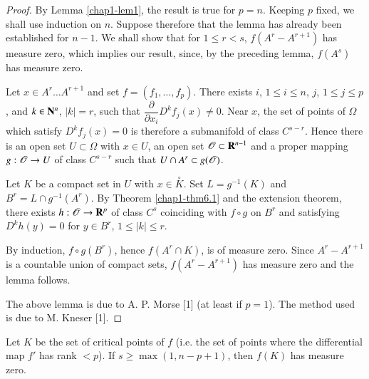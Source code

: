 \begin{proof}
By Lemma \ref{chap1-lem1}, the result is true for $p=n$. Keeping $p$ fixed, we shall use induction on $n$. Suppose therefore that the lemma has already been established for $n-1$. We shall show that for $1\leq r<s$, $f(A^{r}-A^{r+1})$ has measure zero, which implies our result, since, by the preceding lemma, $f(A^{s})$ has measure zero.

Let $x\in A^{r}\ldots A^{r+1}$ and set $f=(f_{1},\ldots,f_{p})$. There exists $i$, $1\leq i\leq n$, $j$, $1\leq j\leq p$, and $k\in \mathbf{N}^{n}$, $|k|=r$, such that $\dfrac{\partial}{\partial x_{i}}D^{k}f_{j}(x)\neq 0$. Near $x$, the set of points of $\Omega$ which satisfy $D^{k}f_{j}(x)=0$ is therefore a submanifold of class $C^{s-r}$. Hence there is an open set $U\subset \Omega$ with $x\in U$, an open set $\mathscr{O}\subset \mathbf{R}^{n-1}$ and a proper mapping $g:\mathscr{O}\to U$ of class $C^{s-r}$ such that $U\cap A^{r}\subset g(\mathscr{O})$.

Let $K$ be a compact set in $U$ with $x\in \overset{\circ}{K}$. Set $L=g^{-1}(K)$ and $B^{r}=L\cap g^{-1}(A^{r})$. By Theorem \ref{chap1-thm6.1} and the extension theorem, there exists $h:\mathscr{O}\to \mathbf{R}^{p}$ of class $C^{s}$ coinciding with $f\circ g$ on $B^{r}$ and satisfying $D^{k}h(y)=0$ for $y\in B^{r}$, $1\leq |k|\leq r$.

By induction, $f\circ g(B^{r})$, hence $f(A^{r}\cap K)$, is of measure zero. Since $A^{r}-A^{r+1}$ is a countable union of compact sets, $f(A^{r}-A^{r+1})$ has measure zero and the lemma follows.

The above lemma is due to A. P. Morse [1] (at least if $p=1$). The method used is due to M. Kneser [1].
\end{proof}

\begin{theorem}[Sard {[1]}.]\label{chap1-thm7.4}
Let $K$ be the set of critical points of $f$ (i.e. the set of points where the differential map $f'$ has rank $<p$). If $s\geq \max (1,n-p+1)$, then $f(K)$ has measure zero.
\end{theorem}

